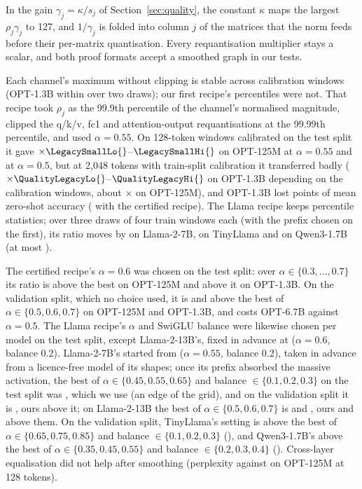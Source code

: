  In the gain $\gamma_j=\kappa/s_j$ of Section~\ref{sec:quality}, the
constant $\kappa$ maps the largest $\rho_j\gamma_j$ to 127, and $1/\gamma_j$ is folded into column $j$
of the matrices that the norm feeds before their per-matrix quantisation. Every requantisation
multiplier stays a scalar, and both proof formats accept a smoothed graph in our tests.

 Each channel's maximum without clipping is stable across calibration
windows (OPT-1.3B within \QualityDrawSpread{} over two draws); our first recipe's percentiles were
not. That recipe took $\rho_j$ as the 99.9th percentile of the channel's normalised magnitude,
clipped the q/k/v, fc1 and attention-output requantisations at the 99.99th percentile, and used
$\alpha=0.55$. On 128-token windows calibrated on the test split it gave
$\times\LegacySmallLo{}$--$\LegacySmallHi{}$ on OPT-125M at $\alpha=0.55$ and at $\alpha=0.5$, but at
2{,}048 tokens with train-split calibration it transferred badly
($\times\QualityLegacyLo{}$--$\QualityLegacyHi{}$ on OPT-1.3B depending on the calibration windows,
about $\times$\QualityLegacyOptS{} on OPT-125M), and OPT-1.3B lost \ZeroshotLegacyMean{} points of
mean zero-shot accuracy (\ZeroshotMeanOptM{} with the certified recipe). The Llama recipe keeps
percentile statistics; over three draws of four train windows each (with the prefix chosen on the
first), its ratio moves by \LlamaSevenDrawSpread{} on Llama-2-7B, \TinyLlamaDrawSpread{} on TinyLlama
and \QwenMDrawSpread{} on Qwen3-1.7B (at most \LlamaDrawSpread{}).

 The certified recipe's
$\alpha=0.6$ was chosen on the test split: over $\alpha\in\{0.3,\dots,0.7\}$ its ratio is
\QualityAlphaGapOptS{} above the best on OPT-125M and \QualityAlphaGapOptM{} above it on OPT-1.3B. On the validation split, which
no choice used, it is \QualityAlphaValGapOptS{} and \QualityAlphaValGapOptM{} above the best of $\alpha\in\{0.5,0.6,0.7\}$ on
OPT-125M and OPT-1.3B, and costs OPT-6.7B \QualityAlphaCostOptL{} against $\alpha=0.5$. The Llama recipe's $\alpha$
and SwiGLU balance were likewise chosen per model on the test split, except Llama-2-13B's, fixed in
advance at ($\alpha=0.6$, balance 0.2). Llama-2-7B's started from ($\alpha=0.55$, balance 0.2), taken in advance from a licence-free model of its shapes; once its
prefix absorbed the massive activation, the best of
$\alpha\in\{0.45,0.55,0.65\}$ and balance $\in\{0.1,0.2,0.3\}$ on the test split was \LlamaSevenTestBest{}, which we use (an edge of
the grid), and on the validation split it is \LlamaSevenValBest{}, ours \LlamaSevenValGap{} above it;
on Llama-2-13B the best of $\alpha\in\{0.5,0.6,0.7\}$ is \LlamaThirteenTestBest{} and \LlamaThirteenValBest{}, ours
\LlamaThirteenTestGap{} and \LlamaThirteenValGap{} above them. On the validation split, TinyLlama's setting is
\TinyLlamaValGap{} above the best of $\alpha\in\{0.65,0.75,0.85\}$ and balance $\in\{0.1,0.2,0.3\}$ (\TinyLlamaValBest{}),
and Qwen3-1.7B's \QwenMValGap{} above the best of $\alpha\in\{0.35,0.45,0.55\}$ and balance $\in\{0.2,0.3,0.4\}$
(\QwenMValBest{}). Cross-layer equalisation did not help after smoothing (perplexity \CleWith{}
against \CleWithout{} on OPT-125M at 128 tokens).

